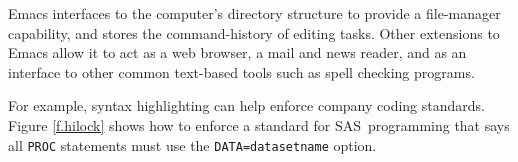\documentclass{article}
\newif\ifdraft
\newcommand*{\SAS}{\textsc{SAS}}
\newcommand{\stexttt}[1]{{\small\texttt{#1}}}
\newcommand{\emptyfig}{
\hspace*{42pt}\rule{324pt}{.25pt}\\
\hspace*{42pt}\rule{.25pt}{10pc}
\rule{316pt}{.25pt}
\rule{.25pt}{10pc}}
\newenvironment{Comment}{\begin{quote}\small\itshape }{\end{quote}}
\begin{document}

Emacs interfaces to the computer's directory structure to provide a
file-manager capability, and stores the command-history of editing
tasks.  Other extensions to Emacs allow it to act as a web browser, a
mail and news reader, and as an interface to other common text-based
tools such as spell checking programs. %

For example, syntax highlighting can help enforce company coding
standards.  Figure \ref{f.hilock} shows how to enforce a standard for
\SAS\ programming that says all \stexttt{PROC} statements must use the
\stexttt{DATA=datasetname} option.

\end{document}
